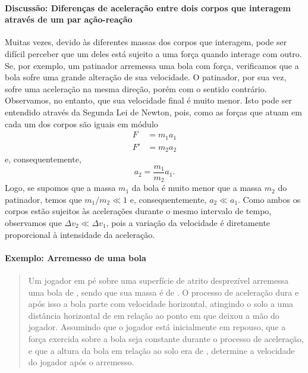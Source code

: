 \paragraph{Discussão: Diferenças de aceleração entre dois corpos que interagem através de um par ação-reação}

Muitas vezes, devido às diferentes massas dos corpos que interagem, pode ser difícil perceber que um deles está sujeito a uma força quando interage com outro. Se, por exemplo, um patinador arremessa uma bola com força, verificamos que a bola sofre uma grande alteração de sua velocidade. O patinador, por sua vez, sofre uma aceleração na mesma direção, porém com o sentido contrário.  Observamos, no entanto, que sua velocidade final é muito menor. Isto pode ser entendido através da Segunda Lei de Newton, pois, como as forças que atuam  em cada um dos corpos são iguais em módulo
\begin{align}
  F &= m_1 a_1 \\
  F' &= m_2 a_2
\end{align}
%
e, consequentemente,
\begin{equation}
  a_2 = \frac{m_1}{m_2} a_1.
\end{equation}
%
Logo, se supomos que a massa $m_1$ da bola é muito menor que a massa $m_2$ do patinador, temos que $m_1/m_2 \ll 1$ e, consequentemente, $a_2 \ll a_1$. Como ambos os corpos estão sujeitos às acelerações durante o mesmo intervalo de tempo, observamos que $\Delta v_2 \ll \Delta v_1$, pois a variação da velocidade é diretamente proporcional à intensidade da aceleração.

\paragraph{Exemplo: Arremesso de uma bola}

\begin{quote}
    Um jogador em pé sobre uma superfície de atrito desprezível arremessa uma bola de , sendo que sua massa é de . O processo de aceleração dura  e após isso a bola parte com velocidade horizontal, atingindo o solo a uma distância horizontal de  em relação ao ponto em que deixou a mão do jogador. Assumindo que o  jogador está inicialmente em repouso, que a força exercida sobre a bola seja constante durante o processo de aceleração, e que a altura da bola em relação ao solo era de , determine a velocidade do jogador após o arremesso.
\end{quote}


